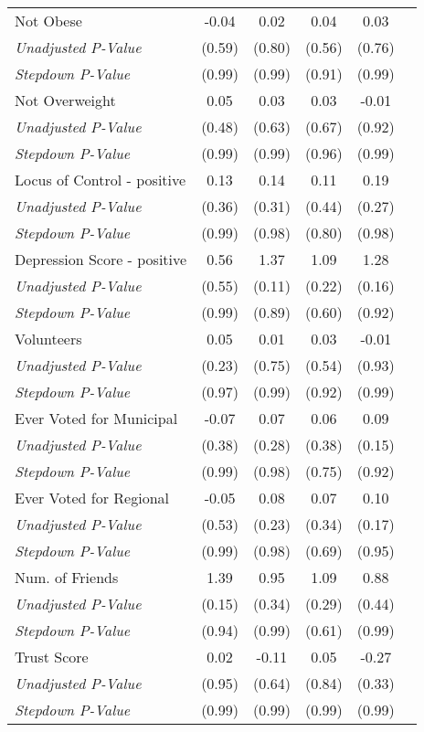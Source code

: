 \begin{tabular}{l c c c c c}
Not Obese & -0.04 & 0.02 & 0.04 & 0.03 \\
\quad \textit{Unadjusted P-Value} & (0.59) & (0.80) & (0.56) & (0.76) \\
\quad \textit{Stepdown P-Value} & (0.99) & (0.99) & (0.91) & (0.99) \\
Not Overweight & 0.05 & 0.03 & 0.03 & -0.01 \\
\quad \textit{Unadjusted P-Value} & (0.48) & (0.63) & (0.67) & (0.92) \\
\quad \textit{Stepdown P-Value} & (0.99) & (0.99) & (0.96) & (0.99) \\
Locus of Control - positive & 0.13 & 0.14 & 0.11 & 0.19 \\
\quad \textit{Unadjusted P-Value} & (0.36) & (0.31) & (0.44) & (0.27) \\
\quad \textit{Stepdown P-Value} & (0.99) & (0.98) & (0.80) & (0.98) \\
Depression Score - positive & 0.56 & 1.37 & 1.09 & 1.28 \\
\quad \textit{Unadjusted P-Value} & (0.55) & (0.11) & (0.22) & (0.16) \\
\quad \textit{Stepdown P-Value} & (0.99) & (0.89) & (0.60) & (0.92) \\
Volunteers & 0.05 & 0.01 & 0.03 & -0.01 \\
\quad \textit{Unadjusted P-Value} & (0.23) & (0.75) & (0.54) & (0.93) \\
\quad \textit{Stepdown P-Value} & (0.97) & (0.99) & (0.92) & (0.99) \\
Ever Voted for Municipal & -0.07 & 0.07 & 0.06 & 0.09 \\
\quad \textit{Unadjusted P-Value} & (0.38) & (0.28) & (0.38) & (0.15) \\
\quad \textit{Stepdown P-Value} & (0.99) & (0.98) & (0.75) & (0.92) \\
Ever Voted for Regional & -0.05 & 0.08 & 0.07 & 0.10 \\
\quad \textit{Unadjusted P-Value} & (0.53) & (0.23) & (0.34) & (0.17) \\
\quad \textit{Stepdown P-Value} & (0.99) & (0.98) & (0.69) & (0.95) \\
Num. of Friends & 1.39 & 0.95 & 1.09 & 0.88 \\
\quad \textit{Unadjusted P-Value} & (0.15) & (0.34) & (0.29) & (0.44) \\
\quad \textit{Stepdown P-Value} & (0.94) & (0.99) & (0.61) & (0.99) \\
Trust Score & 0.02 & -0.11 & 0.05 & -0.27 \\
\quad \textit{Unadjusted P-Value} & (0.95) & (0.64) & (0.84) & (0.33) \\
\quad \textit{Stepdown P-Value} & (0.99) & (0.99) & (0.99) & (0.99) \\
\bottomrule
\end{tabular}
